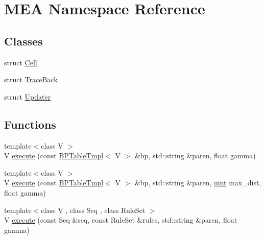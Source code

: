 \hypertarget{namespace_m_e_a}{\section{M\+E\+A Namespace Reference}
\label{namespace_m_e_a}
}
\subsection*{Classes}
\begin{DoxyCompactItemize}
\item 
struct \hyperlink{struct_m_e_a_1_1_cell}{Cell}
\item 
struct \hyperlink{struct_m_e_a_1_1_trace_back}{Trace\+Back}
\item 
struct \hyperlink{struct_m_e_a_1_1_updater}{Updater}
\end{DoxyCompactItemize}
\subsection*{Functions}
\begin{DoxyCompactItemize}
\item 
{\footnotesize template$<$class V $>$ }\\V \hyperlink{namespace_m_e_a_ac4c2f8f5f874e59fa6137637247cb535}{execute} (const \hyperlink{class_b_p_table_tmpl}{B\+P\+Table\+Tmpl}$<$ V $>$ \&bp, std\+::string \&paren, float gamma)
\item 
{\footnotesize template$<$class V $>$ }\\V \hyperlink{namespace_m_e_a_ae7da3a697d03f2697f3822dad28ae3d7}{execute} (const \hyperlink{class_b_p_table_tmpl}{B\+P\+Table\+Tmpl}$<$ V $>$ \&bp, std\+::string \&paren, \hyperlink{cyktable_8h_a91ad9478d81a7aaf2593e8d9c3d06a14}{uint} max\+\_\+dist, float gamma)
\item 
{\footnotesize template$<$class V , class Seq , class Rule\+Set $>$ }\\V \hyperlink{namespace_m_e_a_ac823e44d792ae66236b84a5d661236a5}{execute} (const Seq \&seq, const Rule\+Set \&rules, std\+::string \&paren, float gamma)
\end{DoxyCompactItemize}


